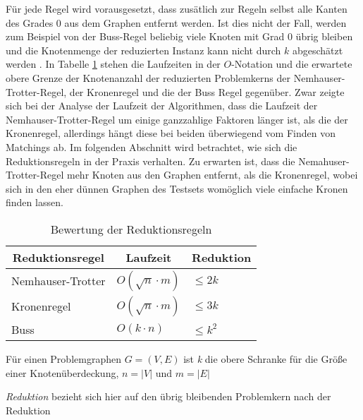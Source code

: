 Für jede Regel wird vorausgesetzt, dass zusätlich zur Regeln selbst alle Kanten des Grades 0 aus dem Graphen entfernt werden. Ist dies nicht der Fall, werden zum Beispiel von der Buss-Regel beliebig viele Knoten mit Grad 0 übrig bleiben und die Knotenmenge der reduzierten Instanz kann nicht durch $k$ abgeschätzt werden .
In Tabelle \ref{tab:liste} stehen die Laufzeiten in der $O$-Notation und die erwartete obere Grenze der Knotenanzahl der reduzierten Problemkerns der Nemhauser-Trotter-Regel, der Kronenregel und die der Buss Regel gegenüber. Zwar zeigte sich bei der Analyse der Laufzeit der Algorithmen, dass die Laufzeit der Nemhauser-Trotter-Regel um einige ganzzahlige Faktoren länger ist, als die der Kronenregel, allerdings hängt diese bei beiden überwiegend vom Finden von Matchings ab. 
Im folgenden Abschnitt wird betrachtet, wie sich die Reduktionsregeln in der Praxis verhalten. Zu erwarten ist, dass die Nemahuser-Trotter-Regel mehr Knoten aus den Graphen entfernt, als die Kronenregel, wobei sich in den eher dünnen Graphen des Testsets womöglich viele einfache Kronen finden lassen. 

\begin{table}[htb]
\caption{Bewertung der Reduktionsregeln\label{tab:liste}}
\vspace*{1em}
\centering
\bgroup
\def\arraystretch{1.3}%

\begin{threeparttable}

\begin{tabular}[c]{lll}
	\hline
	\multicolumn{1}{c}{\textbf{Reduktionsregel}} & 
	\multicolumn{1}{c}{\textbf{Laufzeit}} & 
	\multicolumn{1}{c}{\textbf{Reduktion}} \\ 
	
	\hline

	Nemhauser-Trotter&$O(\sqrt{n} \cdot m)$&  $\leq 2k$\\
	Kronenregel&$O(\sqrt{n} \cdot m)$ & $\leq 3k$\\
	Buss&$O(k \cdot n)$  & $\leq k^{2}$\\
	\hline
\end{tabular}

\begin{tablenotes}\footnotesize
\item Für einen Problemgraphen $G=(V,E)$ ist \emph{k} die obere Schranke für die Größe einer Knotenüberdeckung, $n=|V|$ und $m=|E|$
\item \emph{Reduktion} bezieht sich hier auf den übrig bleibenden Problemkern nach der Reduktion
\end{tablenotes}

\end{threeparttable}

\egroup

\end{table}


